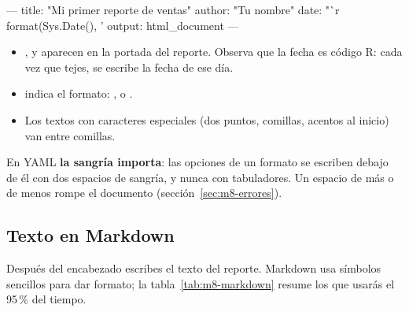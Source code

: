 \begin{textocodigo}
---
title: "Mi primer reporte de ventas"
author: "Tu nombre"
date: "`r format(Sys.Date(), '%
output: html_document
---
\end{textocodigo}

\begin{itemize}
  \item {},  y  aparecen en la
        portada del reporte. Observa que la fecha es código R: cada vez que
        tejes, se escribe la fecha de ese día.
  \item {} indica el formato: ,
         o .
  \item Los textos con caracteres especiales (dos puntos, comillas, acentos
        al inicio) van entre comillas.
\end{itemize}

\begin{advertencia}
En YAML \textbf{la sangría importa}: las opciones de un formato se escriben
debajo de él con dos espacios de sangría, y nunca con tabuladores. Un
espacio de más o de menos rompe el documento
(sección~\ref{sec:m8-errores}).
\end{advertencia}

\subsection{Texto en Markdown}

Después del encabezado escribes el texto del reporte. Markdown usa símbolos
sencillos para dar formato; la tabla~\ref{tab:m8-markdown} resume los que
usarás el 95\,\% del tiempo.

